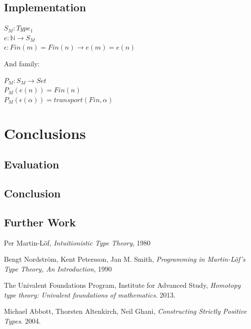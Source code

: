 \documentclass[12pt]{report}
\begin{document}
\chapter{Implementation}
\begin{center}
$S_M : Type_1$\\
$e : \mathbb{N} \to S_M$\\
$\epsilon : Fin(m) = Fin(n) \to e(m) = e(n) $\\
\end{center}
And family:
\begin{center}
$P_M : S_M \to Set$\\
$P_M(e(n)) = Fin(n)$\\
$P_M(\epsilon(\alpha)) = transport(Fin, \alpha)$\\

\part{Conclusions}

\chapter{Evaluation}

\chapter{Conclusion}

\chapter{Further Work}

\cleardoublepage
{}
{}

\begin{thebibliography}{10}

  Per Martin-L\"of,
  \emph{Intuitionistic Type Theory},
  1980

  Bengt Nordstr\"om, Kent Petersson, Jan M. Smith,
  \emph{Programming in Martin-L\"of's Type Theory, An Introduction},
  1990

  The Univalent Foundations Program, Institute for Advanced Study,
  \emph{Homotopy type theory: Univalent foundations of mathematics}.
  2013.

  Michael Abbott, Thorsten Altenkirch, Neil Ghani,
  \emph{Constructing Strictly Positive Types}.
  2004.
  

\end{thebibliography}
\end{center}
\end{document}
